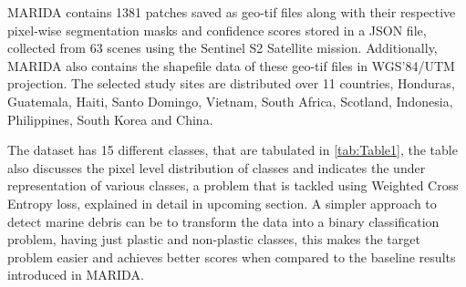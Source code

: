 \documentclass[review]{elsarticle}
\begin{document}
\begin{table}[]
\centering
\caption{MARIDA class distribution}
\label{tab:Table1}
\end{table}
MARIDA contains 1381 patches saved as geo-tif files along with their respective pixel-wise segmentation masks and confidence scores stored in a JSON file, collected from 63 scenes using the Sentinel S2 Satellite mission. Additionally, MARIDA also contains the shapefile data of these geo-tif files in WGS'84/UTM projection. The selected study sites are distributed over 11 countries, Honduras, Guatemala, Haiti, Santo Domingo, Vietnam, South Africa, Scotland, Indonesia, Philippines, South Korea and China.

The dataset has 15 different classes, that are tabulated in \autoref{tab:Table1}, the table also discusses the pixel level distribution of classes and indicates the under representation of various classes, a problem that is tackled using Weighted Cross Entropy loss, explained in detail in upcoming section.
A simpler approach to detect marine debris can be to transform the data into a binary classification problem, having just plastic and non-plastic classes, this makes the target problem easier and achieves better scores when compared to the baseline results introduced in MARIDA\cite{Booth2022HighprecisionDM}.
\end{document}
